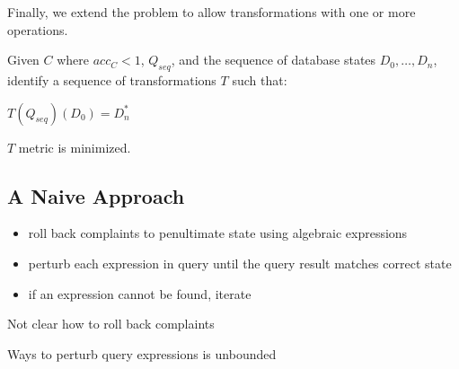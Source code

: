 Finally, we extend the problem to allow transformations with one or more operations.

\begin{problem}\label{prob:multi}
Given $C$ where $acc_C < 1$, $Q_{seq}$, and the sequence of database states $D_0,\ldots,D_n$, 
identify a sequence of transformations $T$ such that:
\begin{CompactItemize}
\item $T(Q_{seq})(D_0) = D^*_n$
\item $T$ metric is minimized.
\end{CompactItemize}
\end{problem}




\subsection{A Naive Approach}

\begin{itemize}
\item roll back complaints to penultimate state using algebraic expressions 
\item perturb each expression in query until the query result matches correct state
\item if an expression cannot be found, iterate
\end{itemize}


Not clear how to roll back complaints

Ways to perturb query expressions is unbounded

